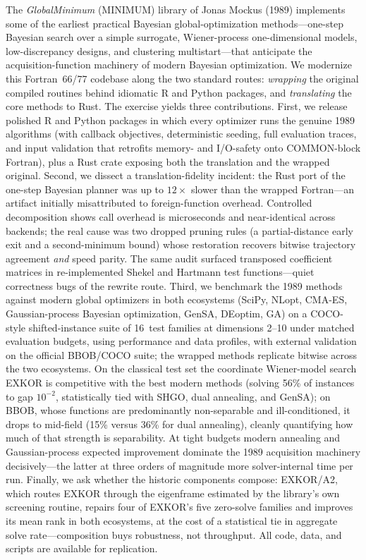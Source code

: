 The \emph{GlobalMinimum} (MINIMUM) library of Jonas Mockus (1989)
implements some of the earliest practical Bayesian global-optimization
methods---one-step Bayesian search over a simple surrogate, Wiener-process
one-dimensional models, low-discrepancy designs, and clustering
multistart---that anticipate the acquisition-function machinery of modern
Bayesian optimization. We modernize this Fortran~66/77 codebase along the
two standard routes: \emph{wrapping} the original compiled routines behind
idiomatic R and Python packages, and \emph{translating} the core methods to
Rust. The exercise yields three contributions. First, we release polished R
and Python packages in which every optimizer runs the genuine 1989
algorithms (with callback objectives, deterministic seeding, full
evaluation traces, and input validation that retrofits memory- and
I/O-safety onto COMMON-block Fortran), plus a Rust crate exposing both the
translation and the wrapped original. Second, we dissect a
translation-fidelity incident: the Rust port of the one-step Bayesian
planner was up to $12\times$ slower than the wrapped Fortran---an artifact
initially misattributed to foreign-function overhead. Controlled
decomposition shows call overhead is microseconds and near-identical across
backends; the real cause was two dropped pruning rules (a partial-distance
early exit and a second-minimum bound) whose restoration recovers bitwise
trajectory agreement \emph{and} speed parity. The same audit surfaced
transposed coefficient matrices in re-implemented Shekel and Hartmann test
functions---quiet correctness bugs of the rewrite route. Third, we
benchmark the 1989 methods against modern global optimizers in both
ecosystems (SciPy, NLopt, CMA-ES, Gaussian-process Bayesian
optimization, GenSA, DEoptim, GA) on a COCO-style
shifted-instance suite of 16~test families at dimensions 2--10 under
matched evaluation budgets, using performance and data profiles, with
external validation on the official BBOB/COCO suite; the wrapped
methods replicate bitwise across the two ecosystems. On the classical
test set the coordinate Wiener-model search EXKOR is competitive with
the best modern methods (solving 56\% of instances to gap $10^{-2}$,
statistically tied with SHGO, dual annealing, and GenSA); on BBOB,
whose functions are predominantly non-separable and ill-conditioned,
it drops to mid-field (15\% versus 36\% for dual annealing), cleanly
quantifying how much of that strength is separability. At tight
budgets modern annealing and Gaussian-process expected improvement
dominate the 1989 acquisition machinery decisively---the latter at
three orders of magnitude more solver-internal time per run. Finally,
we ask whether the historic components compose: EXKOR/A2, which routes
EXKOR through the eigenframe estimated by the library's own screening
routine, repairs four of EXKOR's five zero-solve families and improves
its mean rank in both ecosystems, at the cost of a statistical tie in
aggregate solve rate---composition buys robustness, not throughput.
All code, data, and scripts are available for replication.
